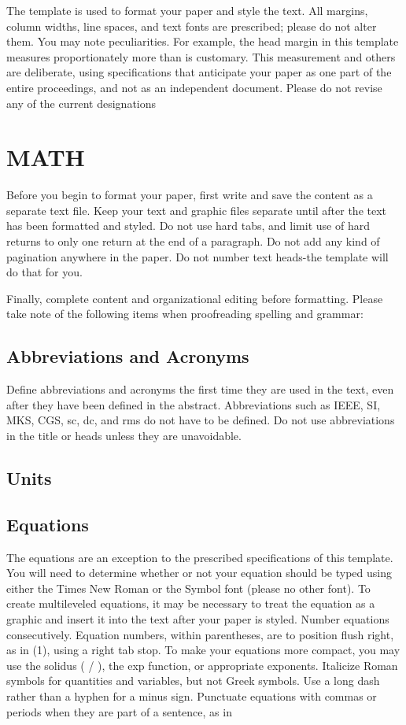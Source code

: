 \documentclass[a4paper, 10pt, conference]{ieeeconf}      %
\begin{document}
The template is used to format your paper and style the text. All margins, column widths, line spaces, and text fonts are prescribed; please do not alter them. You may note peculiarities. For example, the head margin in this template measures proportionately more than is customary. This measurement and others are deliberate, using specifications that anticipate your paper as one part of the entire proceedings, and not as an independent document. Please do not revise any of the current designations

\section{MATH}

Before you begin to format your paper, first write and save the content as a separate text file. Keep your text and graphic files separate until after the text has been formatted and styled. Do not use hard tabs, and limit use of hard returns to only one return at the end of a paragraph. Do not add any kind of pagination anywhere in the paper. Do not number text heads-the template will do that for you.

Finally, complete content and organizational editing before formatting. Please take note of the following items when proofreading spelling and grammar:

\subsection{Abbreviations and Acronyms} Define abbreviations and acronyms the first time they are used in the text, even after they have been defined in the abstract. Abbreviations such as IEEE, SI, MKS, CGS, sc, dc, and rms do not have to be defined. Do not use abbreviations in the title or heads unless they are unavoidable.

\subsection{Units}


\subsection{Equations}

The equations are an exception to the prescribed specifications of this template. You will need to determine whether or not your equation should be typed using either the Times New Roman or the Symbol font (please no other font). To create multileveled equations, it may be necessary to treat the equation as a graphic and insert it into the text after your paper is styled. Number equations consecutively. Equation numbers, within parentheses, are to position flush right, as in (1), using a right tab stop. To make your equations more compact, you may use the solidus ( / ), the exp function, or appropriate exponents. Italicize Roman symbols for quantities and variables, but not Greek symbols. Use a long dash rather than a hyphen for a minus sign. Punctuate equations with commas or periods when they are part of a sentence, as in
\end{document}

